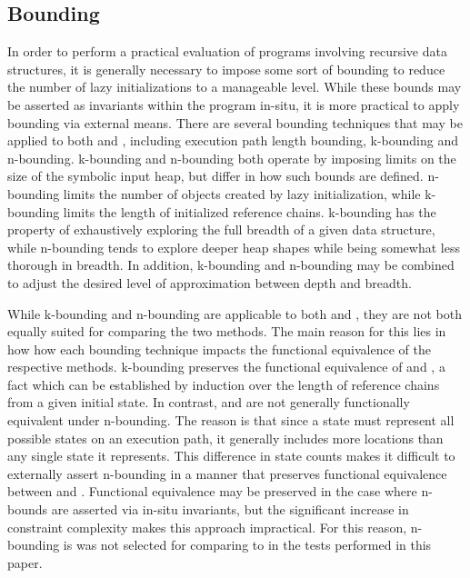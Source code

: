 \subsection{Bounding}
In order to perform a practical evaluation of programs involving recursive data structures, it is generally necessary to impose some sort of bounding to reduce the number of lazy initializations to a manageable level. While these bounds may be asserted as invariants within the program in-situ, it is more practical to apply bounding via external means. There are several bounding techniques that may be applied to both \gsetxt{} and \symtxt{}, including execution path length bounding, k-bounding and n-bounding. k-bounding and n-bounding both operate by imposing limits on the size of the symbolic input heap, but differ in how such bounds are defined. n-bounding limits the number of objects created by lazy initialization, while k-bounding limits the length of initialized reference chains. k-bounding has the property of exhaustively exploring the full breadth of a given data structure, while n-bounding tends to explore deeper heap shapes while being somewhat less thorough in breadth. In addition, k-bounding and n-bounding may be combined to adjust the desired level of approximation between depth and breadth.

While k-bounding and n-bounding are applicable to both \gsetxt{} and \symtxt{}, they are not both equally suited for comparing the two methods. The main reason for this lies in how how each bounding technique impacts the functional equivalence of the respective methods.  k-bounding preserves the functional equivalence of \gsetxt{} and \symtxt{}, a fact which can be established by induction over the length of reference chains from a given initial state. In contrast, \gsetxt{} and \symtxt{} are not generally functionally equivalent under n-bounding. The reason is that since a \symtxt{} state must represent all possible \gsetxt{} states on an execution path, it generally includes more locations than any single \gsetxt{} state it represents. This difference in state counts makes it difficult to externally assert n-bounding in a manner that preserves functional equivalence between \gsetxt{} and \symtxt{}. Functional equivalence may be preserved in the case where n-bounds are asserted via in-situ invariants, but the significant increase in constraint complexity makes this approach impractical. For this reason, n-bounding is was not selected for comparing \gsetxt{} to \symtxt{} in the tests performed in this paper.

